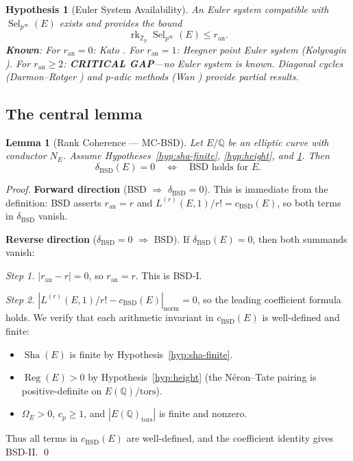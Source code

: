 \documentclass[11pt]{article}
\newtheorem{lemma}[theorem]{Lemma}
\newtheorem{hypothesis}[theorem]{Hypothesis}
\DeclareMathOperator{\rk}{rk}
\DeclareMathOperator{\Reg}{Reg}
\DeclareMathOperator{\Sha}{Sha}
\DeclareMathOperator{\Sel}{Sel}
\begin{document}
\begin{hypothesis}[Euler System Availability]
\label{hyp:euler}
An Euler system compatible with $\Sel_{p^\infty}(E)$ exists and provides the
bound
\[
  \rk_{\mathbb{Z}_p} \Sel_{p^\infty}(E) \leq r_{\mathrm{an}}.
\]
\textbf{Known}: For $r_{\mathrm{an}} = 0$: Kato \cite{Kato}.  For
$r_{\mathrm{an}} = 1$: Heegner point Euler system (Kolyvagin \cite{Koly}).
For $r_{\mathrm{an}} \geq 2$: \textbf{CRITICAL GAP}---no Euler system is
known.  Diagonal cycles (Darmon--Rotger \cite{DR}) and $p$-adic methods
(Wan \cite{Wan}) provide partial results.
\end{hypothesis}

\subsection{The central lemma}

\begin{lemma}[Rank Coherence --- MC-BSD]
\label{lem:MC-BSD}
Let $E/\mathbb{Q}$ be an elliptic curve with conductor $N_E$.  Assume
Hypotheses~\ref{hyp:sha-finite}, \ref{hyp:height}, and \ref{hyp:euler}.  Then
\[
  \delta_{\mathrm{BSD}}(E) = 0
  \quad \Longleftrightarrow \quad
  \text{BSD holds for } E.
\]
\end{lemma}

\begin{proof}
\textbf{Forward direction} (BSD $\Rightarrow$ $\delta_{\mathrm{BSD}} = 0$).
This is immediate from the definition: BSD asserts $r_{\mathrm{an}} = r$ and
$L^{(r)}(E,1)/r! = c_{\mathrm{BSD}}(E)$, so both terms in
$\delta_{\mathrm{BSD}}$ vanish.

\textbf{Reverse direction} ($\delta_{\mathrm{BSD}} = 0$ $\Rightarrow$ BSD).
If $\delta_{\mathrm{BSD}}(E) = 0$, then both summands vanish:

\emph{Step 1.} $|r_{\mathrm{an}} - r| = 0$, so $r_{\mathrm{an}} = r$.  This
is BSD-I.

\emph{Step 2.} $|L^{(r)}(E,1)/r! - c_{\mathrm{BSD}}(E)|_{\mathrm{norm}} = 0$,
so the leading coefficient formula holds.  We verify that each arithmetic
invariant in $c_{\mathrm{BSD}}(E)$ is well-defined and finite:

\begin{itemize}
  \item $\Sha(E)$ is finite by Hypothesis~\ref{hyp:sha-finite}.
  \item $\Reg(E) > 0$ by Hypothesis~\ref{hyp:height} (the N\'eron--Tate pairing
    is positive-definite on $E(\mathbb{Q})/\mathrm{tors}$).
  \item $\Omega_E > 0$, $c_p \geq 1$, and $|E(\mathbb{Q})_{\mathrm{tors}}|$ is
    finite and nonzero.
\end{itemize}

Thus all terms in $c_{\mathrm{BSD}}(E)$ are well-defined, and the coefficient
identity gives BSD-II. \qed
\end{proof}
\end{document}
